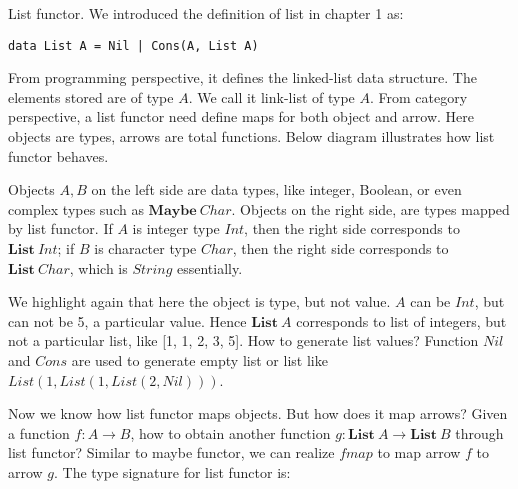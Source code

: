 \documentclass{article}
\begin{document}
\begin{example}
\normalfont
{}
List functor. We introduced the definition of list in chapter 1 as:

\lstset{frame=none}
\begin{lstlisting}
data List A = Nil | Cons(A, List A)
\end{lstlisting}

From programming perspective, it defines the linked-list data structure. The elements stored are of type $A$. We call it link-list of type $A$. From category perspective, a list functor need define maps for both object and arrow. Here objects are types, arrows are total functions. Below diagram illustrates how list functor behaves.

\begin{center}
\end{center}

Objects $A, B$ on the left side are data types, like integer, Boolean, or even complex types such as $\mathbf{Maybe}\ Char$. Objects on the right side, are types mapped by list functor. If $A$ is integer type $Int$, then the right side corresponds to $\mathbf{List}\ Int$; if $B$ is character type $Char$, then the right side corresponds to $\mathbf{List}\ Char$, which is $String$ essentially.

We highlight again that here the object is type, but not value. $A$ can be $Int$, but can not be 5, a particular value. Hence $\mathbf{List}\ A$ corresponds to list of integers, but not a particular list, like [1, 1, 2, 3, 5]. How to generate list values? Function $Nil$ and $Cons$ are used to generate empty list or list like $List(1, List(1, List(2, Nil)))$.

Now we know how list functor maps objects. But how does it map arrows? Given a function $f: A \to B$, how to obtain another function $g: \mathbf{List}\ A \to \mathbf{List}\ B$ through list functor? Similar to maybe functor, we can realize $fmap$ to map arrow $f$ to arrow $g$. The type signature for list functor is:


\end{example}
\end{document}
